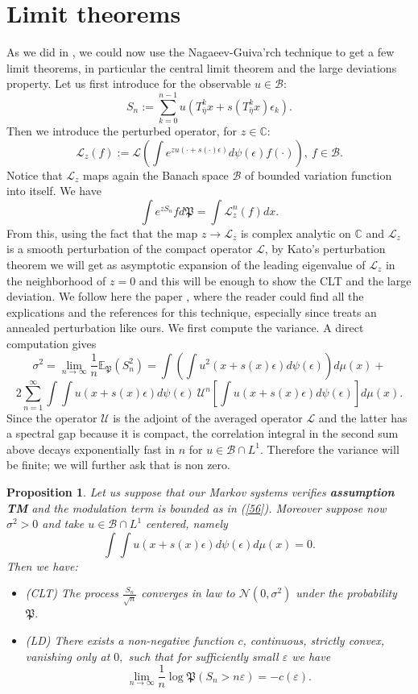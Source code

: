 \documentclass{article}
\newcommand{\1}{\mathbbm{1}}
\newtheorem{proposition}[theorem]{Proposition}
\begin{document}
\section{Limit theorems}\label{LLTT}
As we did in \cite{lillo22}, we could now use the Nagaeev-Guiva'rch technique to get a few limit theorems, in particular the central limit theorem and the large deviations property.
 Let us first introduce for the observable $u\in {\mathcal B}$:
$$
S_n:=\sum_{k=0}^{n-1}u(T^k_{\overline{\eta}}x+s(T^k_{\overline{\eta}}x)\epsilon_k).
$$
Then we introduce the perturbed operator, for $z\in \mathbb{C}:$
 $$
\mathcal{L}_z(f):=\mathcal{L}(\int e^{zu(\cdot+s(\cdot)\epsilon) }d\psi(\epsilon)f(\cdot)), \  f\in \mathcal{B}.
$$
Notice that $\mathcal{L}_z$ maps again  the Banach space $\mathcal{B}$ of bounded variation function into itself.
We have
$$
\int e^{zS_n} fd\mathfrak{P}=\int \mathcal{L}_z^n(f)dx.
$$
From this, using the fact that the map $z\rightarrow \mathcal{L}_z$ is complex analytic on $\mathbb{C}$ and $\mathcal{L}_z$ is a smooth perturbation of the compact operator $\mathcal{L}$, by   Kato's perturbation theorem we will get as asymptotic expansion of the leading eigenvalue of $\mathcal{L}_z$ in the neighborhood of $z=0$ and this will be enough to show  the CLT and the large deviation.  
 We follow here the paper \cite{ANV}, where the reader could find all the explications and the references for this technique, especially since \cite{ANV} treats an annealed perturbation like ours.
 We first compute the variance. A direct computation gives
$$
\sigma^2=\lim_{n\rightarrow \infty}\frac1n\mathbb{E}_{\mathfrak{P}}(S_n^2)=\int \left(\int u^2(x+s(x)\epsilon)d\psi(\epsilon)\right)d\mu(x)+
$$
$$
2\sum_{n=1}^{\infty}\int \int u(x+s(x)\epsilon)d\psi(\epsilon)\ \mathcal{U}^n\left[\int u(x+s(x)\epsilon)d\psi(\epsilon)\right]d\mu(x).
$$
Since the operator $\mathcal{U}$ is the adjoint of the averaged operator $\mathcal{L}$ and the latter has a spectral gap  because it is compact, the correlation integral in the second sum above decays exponentially fast in $n$ for $u\in \mathcal{B}\cap L^1.$ Therefore the variance will be finite; we will further ask  that is non zero.
\begin{proposition}
Let us suppose that our Markov systems verifies {\bf assumption TM} and the modulation term is bounded as in (\ref{56}). Moreover suppose now $\sigma^2>0$ and take $u\in \mathcal{B}\cap L^1$ centered, namely 
$$
\int \int u(x+s(x)\epsilon) d\psi(\epsilon)d\mu(x)=0.
$$
Then we have:
    \begin{itemize}
    
\item (CLT) The process $\frac{S_n}{\sqrt{n}}$ converges in law to $\mathcal{N}(0, \sigma^2)$ under the probability $\mathfrak{P}.$
\item (LD) There exists a non-negative function $c$, continuous, strictly convex, vanishing only at $0,$ such that for sufficiently small $\varepsilon$ we have
$$
\lim_{n\rightarrow \infty}\frac1n \log \mathfrak{P}(S_n>n\varepsilon)=-c(\varepsilon).
$$

    \end{itemize}
    \end{proposition}
\end{document}
